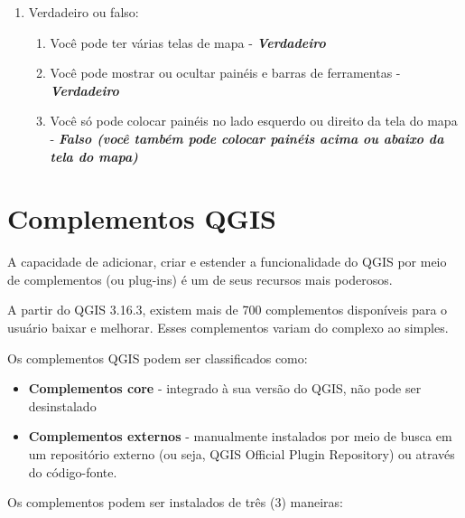 \documentclass[
]{krantz}
\providecommand{\tightlist}{%
  \setlength{\itemsep}{0pt}\setlength{\parskip}{0pt}}
\begin{document}
\begin{enumerate}
\def\labelenumi{\arabic{enumi}.}
\tightlist
\item
  Verdadeiro ou falso:

  \begin{enumerate}
  \def\labelenumii{\arabic{enumii}.}
  \tightlist
  \item
    Você pode ter várias telas de mapa - \textbf{\emph{Verdadeiro}}
  \item
    Você pode mostrar ou ocultar painéis e barras de ferramentas - \textbf{\emph{Verdadeiro}}
  \item
    Você só pode colocar painéis no lado esquerdo ou direito da tela do mapa - \textbf{\emph{Falso (você também pode colocar painéis acima ou abaixo da tela do mapa)}}
  \end{enumerate}
\end{enumerate}

\hypertarget{complementos-qgis}{%
\section{Complementos QGIS}\label{complementos-qgis}}

A capacidade de adicionar, criar e estender a funcionalidade do QGIS por meio de complementos (ou plug-ins) é um de seus recursos mais poderosos.

A partir do QGIS 3.16.3, existem mais de 700 complementos disponíveis para o usuário baixar e melhorar. Esses complementos variam do complexo ao simples.

Os complementos QGIS podem ser classificados como:

\begin{itemize}
\tightlist
\item
  \textbf{Complementos core} - integrado à sua versão do QGIS, não pode ser desinstalado
\item
  \textbf{Complementos externos} - manualmente instalados por meio de busca em um repositório externo (ou seja, QGIS Official Plugin Repository) ou através do código-fonte.
\end{itemize}

Os complementos podem ser instalados de três (3) maneiras:
\end{document}
